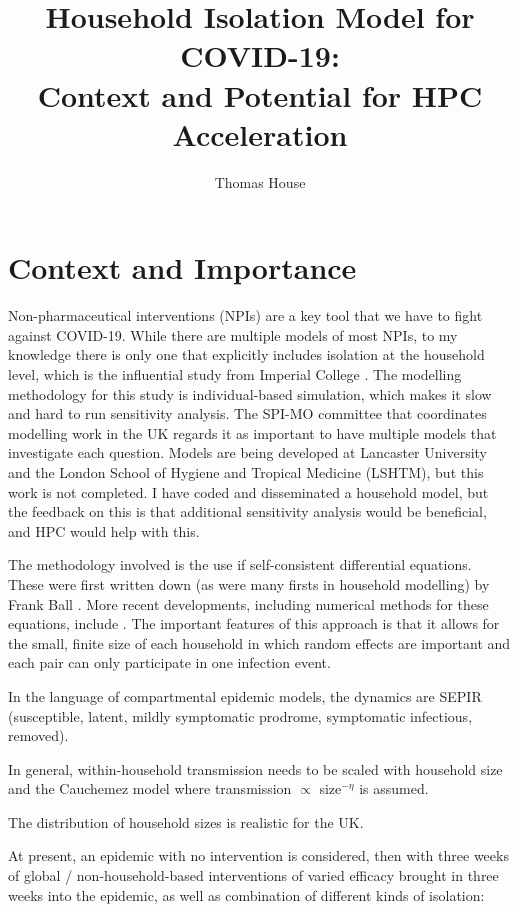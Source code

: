 \documentclass[10pt,a4paper]{article}
\title{\sc Household Isolation Model for COVID-19:\\
Context and Potential for HPC Acceleration}
\author{Thomas House}
\begin{document}
\maketitle

\section{Context and Importance}

Non-pharmaceutical interventions (NPIs) are a key tool that we have to fight
against COVID-19. While there are multiple models of most NPIs, to my knowledge
there is only one that explicitly includes isolation at the household level,
which is the influential study from Imperial College \cite{ferguson:2020}.  The
modelling methodology for this study is individual-based simulation, which
makes it slow and hard to run sensitivity analysis. The SPI-MO committee that
coordinates modelling work in the UK regards it as important to have multiple
models that investigate each question. Models are being developed at Lancaster
University and the London School of Hygiene and Tropical Medicine (LSHTM), but
this work is not completed. I have coded and disseminated a household model,
but the feedback on this is that additional sensitivity analysis would be
beneficial, and HPC would help with this.

The methodology involved is the use if self-consistent differential equations.
These were first written down (as were many firsts in household modelling) by
Frank Ball \cite{Ball:1999}. More recent developments, including numerical
methods for these equations, include
\cite{House:2008,Black:2017,Kinyanjui:2018}. The important features of this
approach is that it allows for the small, finite size of each household in
which random effects are important and each pair can only participate in
one infection event.

In the language of compartmental epidemic models, the dynamics are SEPIR
(susceptible, latent, mildly symptomatic prodrome, symptomatic infectious,
removed).

In general, within-household transmission needs to be scaled with household
size and the Cauchemez model where transmission $\propto$ size$^{-\eta}$  is
assumed.

The distribution of household sizes is realistic for the UK.

At present, an epidemic with no intervention is considered, then with three
weeks of global / non-household-based interventions of varied efficacy brought
in three weeks into the epidemic, as well as combination of different kinds of
isolation:
\end{document}
